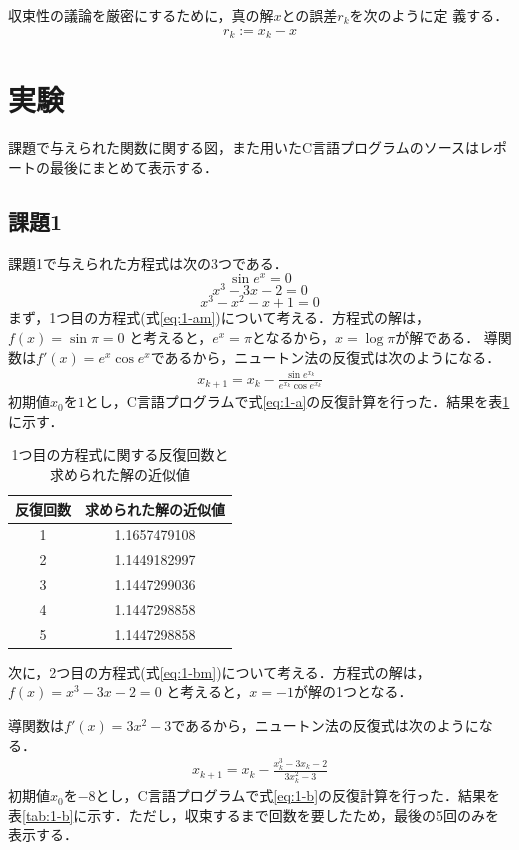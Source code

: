 \documentclass[12pt]{jarticle}
\renewcommand  \[  {\begin{eqnarray}}
\renewcommand  \]  {\end{eqnarray}}
\begin{document}
収束性の議論を厳密にするために，真の解$x$との誤差$r_k$を次のように定
義する．
\[
\label{eq:deferr}
r_k := x_k - x
\]


\section{実験}
\label{sec:exp}
課題で与えられた関数に関する図，また用いたC言語プログラムのソースはレポートの最後にまとめて表示する．
\subsection{課題1}
課題1で与えられた方程式は次の3つである．
\begin{equation}
\sin e^x = 0
\label{eq:1-am}
\end{equation}
\begin{equation}
x^3-3x-2 = 0
\label{eq:1-bm}
\end{equation}
\begin{equation}
x^3-x^2-x+1 = 0
\label{eq:1-cm}
\end{equation}
まず，1つ目の方程式(式\ref{eq:1-am})について考える．方程式の解は，$f(x)=\sin\pi=0$
と考えると，$e^x=\pi$となるから，$x=\log\pi$が解である．
導関数は$f\prime(x)=e^x\cos e^x$であるから，ニュートン法の反復式は次のようになる．
\[
\label{eq:1-a}
x_{k+1}=x_k- \frac{\sin e^{x_k}}{e^{x_k}\cos e^{x_k}}
\]
初期値$x_0$を$1$とし，C言語プログラムで式\ref{eq:1-a}の反復計算を行った．結果を表\ref{tab:1-a}に示す．


\begin{table}[t]
 \caption{1つ目の方程式に関する反復回数と求められた解の近似値}
 \label{tab:1-a}
 \center
\begin{tabular}{|c|c|}
\hline
反復回数 &求められた解の近似値 \\
\hline
1  & 1.1657479108 \\
2  & 1.1449182997 \\
3  & 1.1447299036 \\
4  & 1.1447298858 \\
5  & 1.1447298858 \\
\hline
 \end{tabular}
\end{table}


次に，2つ目の方程式(式\ref{eq:1-bm})について考える．方程式の解は，$f(x)=x^3-3x-2=0$
と考えると，$x=-1$が解の1つとなる．

導関数は$f\prime(x)=3x^2-3$であるから，ニュートン法の反復式は次のようになる．
\[
\label{eq:1-b}
x_{k+1}=x_k- \frac{x_k^3-3x_k-2}{3x_k^2-3}
\]
初期値$x_0$を$-8$とし，C言語プログラムで式\ref{eq:1-b}の反復計算を行った．結果を表\ref{tab:1-b}に示す．ただし，収束するまで回数を要したため，最後の5回のみを表示する．
\end{document}
